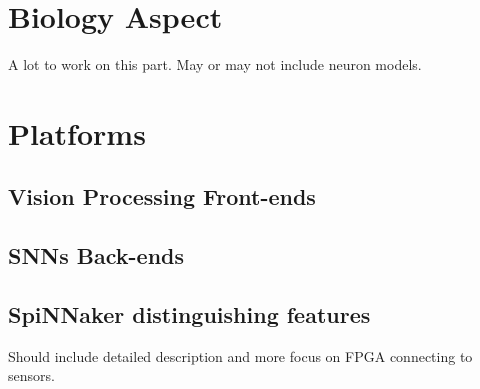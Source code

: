 \section{Biology Aspect}
\label{sec:bio}
A lot to work on this part.
May or may not include neuron models.

\section{Platforms}
\label{sec:plt}
\subsection{Vision Processing Front-ends}
\subsection{SNNs Back-ends}
\subsection{SpiNNaker distinguishing features}
Should include detailed description and more focus on FPGA connecting to sensors.
